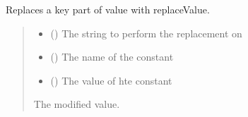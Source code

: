 \documentclass[letterpaper,10pt,english]{sphinxmanual}
\begin{document}
\begin{fulllineitems}
\begin{fulllineitems}
\label{\detokenize{apache_commons_validator_python.util:apache_commons_validator_python.util.validator_utils.ValidatorUtils.replace}}
\pysigstartsignatures
{}
\pysigstopsignatures
\sphinxAtStartPar
Replaces a key part of value with replaceValue.
\begin{quote}\begin{description}
\begin{itemize}
\item {} 
\sphinxAtStartPar
{} () \textendash{} The string to perform the replacement on

\item {} 
\sphinxAtStartPar
{} () \textendash{} The name of the constant

\item {} 
\sphinxAtStartPar
{} () \textendash{} The value of hte constant

\end{itemize}

\sphinxAtStartPar
The modified value.

\end{description}\end{quote}

\end{fulllineitems}


\end{fulllineitems}

\end{document}
